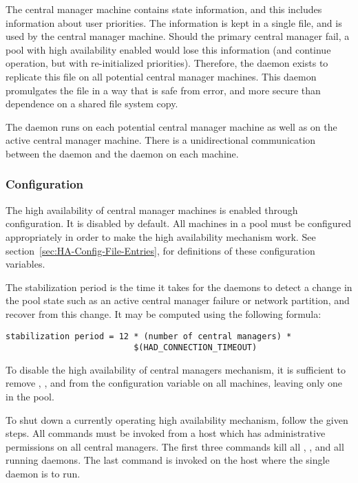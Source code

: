 The central manager machine contains state information,
and this includes information about user priorities.
The information is kept in a single file, 
and is used by the central manager machine.
Should the primary central manager fail,
a pool with high availability enabled would lose this information
(and continue operation, but with re-initialized priorities). 
Therefore, the  daemon exists
to replicate this file on all potential central manager machines.
This daemon promulgates the file in a way that is safe from error,
and more secure than dependence on a shared file system copy.

The  daemon runs on each
potential central manager machine as well as on
the active central manager machine.
There is a unidirectional communication between the 
daemon and the  daemon on each machine.

\subsubsection{\label{sec:HA-configuration} Configuration} 

The high availability of central manager machines is
enabled through configuration.
It is disabled by default.
All machines in a pool must be configured appropriately
in order to make the high availability mechanism work.
See
section~\ref{sec:HA-Config-File-Entries},
for definitions of these configuration variables.

The stabilization period is the time it takes for the 
 daemons
to detect a change in the pool state such as
an active central manager failure
or network partition, and recover from this change.
It may be computed using the following formula:
\footnotesize
\begin{verbatim}
stabilization period = 12 * (number of central managers) *
                          $(HAD_CONNECTION_TIMEOUT)
\end{verbatim}
\normalsize


To disable the high availability of central managers mechanism,
it is sufficient to remove
, ,  and  from the
 configuration variable on all machines,
leaving only one  in the pool. 

To shut down a currently operating high availability mechanism,
follow the given steps.
All commands must be invoked
from a host which has administrative permissions
on all central managers.
The first three commands kill all ,
,
and all running  daemons.
The last command is invoked on the host where the
single  daemon is to run.

